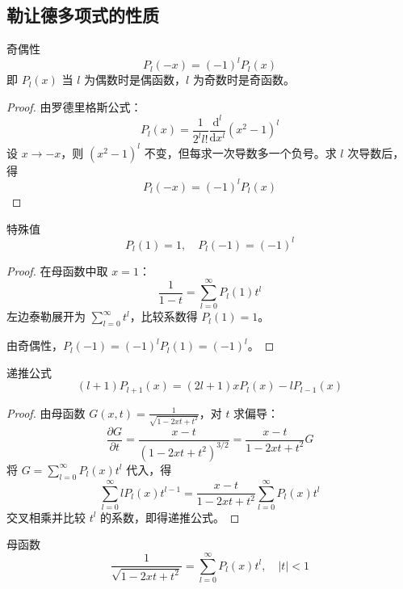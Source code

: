 \subsection{勒让德多项式的性质}

\begin{dingli}{奇偶性}{}
\begin{equation}
    P_l(-x) = (-1)^l P_l(x)
\end{equation}
即 $P_l(x)$ 当 $l$ 为偶数时是偶函数，$l$ 为奇数时是奇函数。
\end{dingli}

\begin{proof}
由罗德里格斯公式：
\begin{equation}
    P_l(x) = \frac{1}{2^l l!}\frac{\mathrm{d}^l}{\mathrm{d}x^l}(x^2 - 1)^l
\end{equation}
设 $x \to -x$，则 $(x^2 - 1)^l$ 不变，但每求一次导数多一个负号。求 $l$ 次导数后，得
\begin{equation}
    P_l(-x) = (-1)^l P_l(x)
\end{equation}
\end{proof}
\begin{dingli}{特殊值}{}
\begin{equation}
    P_l(1) = 1, \quad P_l(-1) = (-1)^l
\end{equation}
\end{dingli}

\begin{proof}
在母函数中取 $x = 1$：
\begin{equation}
    \frac{1}{1 - t} = \sum_{l=0}^{\infty} P_l(1) t^l
\end{equation}
左边泰勒展开为 $\sum_{l=0}^{\infty} t^l$，比较系数得 $P_l(1) = 1$。

由奇偶性，$P_l(-1) = (-1)^l P_l(1) = (-1)^l$。
\end{proof}
\begin{dingli}{递推公式}{}
\begin{equation}
    \boxed{(l+1)P_{l+1}(x) = (2l+1)xP_l(x) - lP_{l-1}(x)}
\end{equation}
\end{dingli}

\begin{proof}
由母函数 $G(x,t) = \frac{1}{\sqrt{1-2xt+t^2}}$，对 $t$ 求偏导：
\begin{equation}
    \frac{\partial G}{\partial t} = \frac{x - t}{(1 - 2xt + t^2)^{3/2}} = \frac{x - t}{1 - 2xt + t^2} G
\end{equation}
将 $G = \sum_{l=0}^{\infty} P_l(x)t^l$ 代入，得
\begin{equation}
    \sum_{l=0}^{\infty} lP_l(x)t^{l-1} = \frac{x - t}{1 - 2xt + t^2} \sum_{l=0}^{\infty} P_l(x)t^l
\end{equation}
交叉相乘并比较 $t^l$ 的系数，即得递推公式。
\end{proof}
\begin{dingli}{母函数}{}
\begin{equation}
    \boxed{\frac{1}{\sqrt{1 - 2xt + t^2}} = \sum_{l=0}^{\infty} P_l(x)t^l, \quad |t| < 1}
\end{equation}
\end{dingli}

